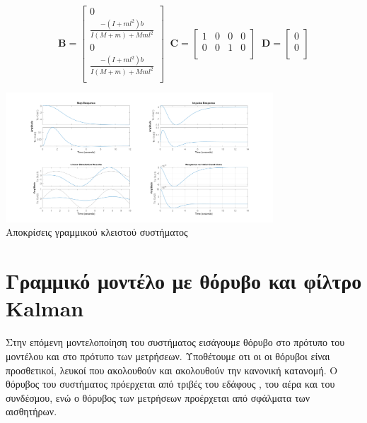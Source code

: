 \documentclass[10pt]{article}
\begin{document}
\[
\mathbf{B} =
\begin{bmatrix}
0 \\
\frac{-(I+ml^2)b}{I(M+m)+Mml^2} \\
0 \\
\frac{-(I+ml^2)b}{I(M+m)+Mml^2} \\
\end{bmatrix} \;\;
\mathbf{C} =
\begin{bmatrix}
1 & 0 & 0 & 0 \\
0 & 0 & 1 & 0 \\
\end{bmatrix} \;\;
\mathbf{D} =
\begin{bmatrix}
0 \\
0 \\
\end{bmatrix}
\]

\begin{center}
\includegraphics[width=10cm]{images/lin_cl_responses.png} \\
Αποκρίσεις γραμμικού κλειστού συστήματος
\end{center}



\section{Γραμμικό μοντέλο με θόρυβο και φίλτρο \textlatin{Kalman}}

Στην επόμενη μοντελοποίηση του συστήματος εισάγουμε θόρυβο στο πρότυπο του μοντέλου και στο πρότυπο των μετρήσεων. Υποθέτουμε οτι οι
οι θόρυβοι είναι προσθετικοί, λευκοί που ακολουθούν και ακολουθούν την κανονική κατανομή. Ο θόρυβος του συστήματος πρόερχεται από τριβές του εδάφους 
, του αέρα και του συνδέσμου, ενώ ο θόρυβος των μετρήσεων προέρχεται από σφάλματα των αισθητήρων.
\end{document}
